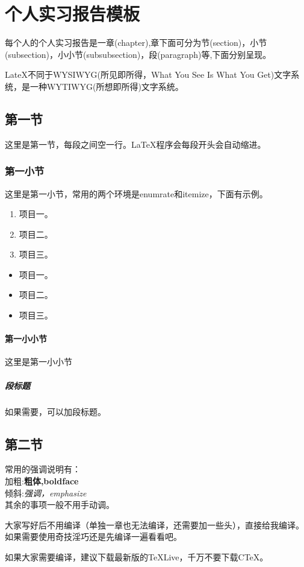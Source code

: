 \chapter{个人实习报告模板}

每个人的个人实习报告是一章(chapter),章下面可分为节(section)，小节(subsection)，小小节(subsubsection)，段(paragraph)等,下面分别呈现。

LateX不同于WYSIWYG(所见即所得，What You See Is What You Get)文字系统，是一种WYTIWYG(所想即所得)文字系统。

\section{第一节}

这里是第一节，每段之间空一行。\LaTeX{}程序会每段开头会自动缩进。

\subsection{第一小节}

这里是第一小节，常用的两个环境是enumrate和itemize，下面有示例。
\begin{enumerate}
\item 项目一。
\item 项目二。
\item 项目三。
\end{enumerate}

\begin{itemize}
\item 项目一。
\item 项目二。
\item 项目三。
\end{itemize}

\subsubsection{第一小小节}

这里是第一小小节

\paragraph{段标题} 如果需要，可以加段标题。

\section{第二节}

常用的强调说明有：\\
加粗:\textbf{粗体,boldface}\\
倾斜:\emph{强调，emphasize}\\
其余的事项一般不用手动调。

大家写好后不用编译（单独一章也无法编译，还需要加一些头），直接给我编译。如果需要使用奇技淫巧还是先编译一遍看看吧。

如果大家需要编译，建议下载最新版的\TeX{}Live，千万不要下载C\TeX。
